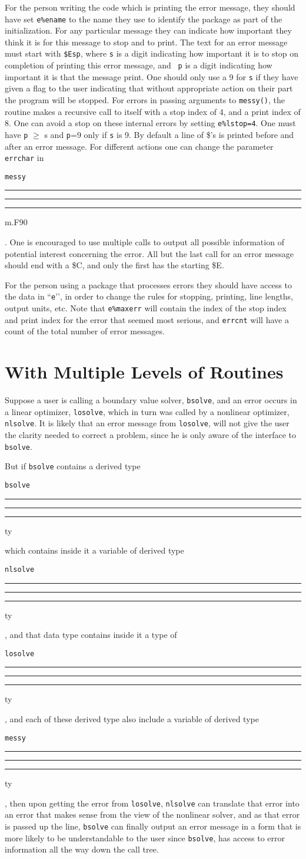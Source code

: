 \documentclass[12pt]{article}
\DeclareRobustCommand{\us}{\rule{.2pt}{0pt}\rule[-.8pt]{.4em}{.5pt}%
  \rule{.2pt}{0pt}}
\DeclareRobustCommand{\us}{\rule{.2pt}{0pt}\rule[-.8pt]{.4em}{.5pt}%
  \rule{.2pt}{0pt}}
\begin{document}
For the person writing the code which is printing the error message, they should
have set {\tt e\%ename} to the name they use to identify the package as part of
the initialization.  For any particular message they can indicate how important
they think it is for this message to stop and to print.  The text for an error
message must start with {\tt \$Esp}, where {\tt s} is a digit indicating how
important it is to stop on completion of printing this error message, and {\tt
  p} is a digit indicating how important it is that the message print.  One
should only use a 9 for {\tt s} if they have given a flag to the user indicating
that without appropriate action on their part the program will be stopped.  For
errors in passing arguments to {\tt messy()}, the routine makes a recursive call
to itself with a stop index of 4, and a print index of 8. One can avoid a stop
on these internal errors by setting {\tt e\%lstop=4}. One must have {\tt p}
$\geq$ s and {\tt p}=9 only if {\tt s} is 9.  By default a line of \$'s is
printed before and after an error message.  For different actions one can change
the parameter {\tt errchar} in {\tt messy\us m.F90}.  One is encouraged to use
multiple calls to output all possible information of potential interest
concerning the error.  All but the last call for an error message should end
with a \$C, and only the first has the starting \$E.

For the person using a package that processes errors they should have access to
the data in ``{\tt e}\rq{}\rq{}, in order to change the rules for stopping,
printing, line lengths, output units, etc.  Note that {\tt e\%maxerr} will
contain the index of the stop index and print index for the error that seemed
most serious, and {\tt errcnt} will have a count of the total number of error
messages.

\section{With Multiple Levels of Routines}
\label{sec:with-multiple-levels}
Suppose a user is calling a boundary value solver, {\tt bsolve}, and an error
occurs in a linear optimizer, {\tt losolve}, which in turn was called by a
nonlinear optimizer, {\tt nlsolve}.  It is likely that an error message from
{\tt losolve}, will not give the user the clarity needed to correct a problem,
since he is only aware of the interface to {\tt bsolve}.

But if {\tt bsolve} contains a derived type {\tt bsolve\us ty} which contains
inside it a variable of derived type {\tt nlsolve\us ty}, and that data type
contains inside it a type of {\tt losolve\us ty}, and each of these derived type
also include a variable of derived type {\tt messy\us ty}, then upon getting the
error from {\tt losolve}, {\tt nlsolve} can translate that error into an error
that makes sense from the view of the nonlinear solver, and as that error is
passed up the line, {\tt bsolve} can finally output an error message in a form
that is more likely to be understandable to the user since {\tt bsolve}, has
access to error information all the way down the call tree.
\end{document}
